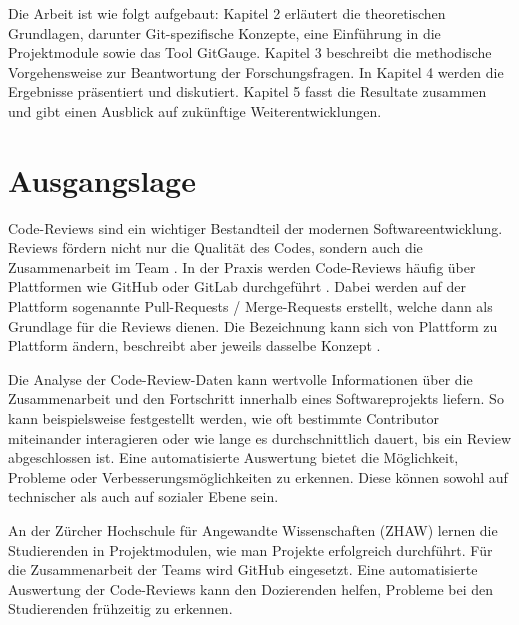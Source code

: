 Die Arbeit ist wie folgt aufgebaut: Kapitel 2 erläutert die theoretischen Grundlagen, darunter Git-spezifische Konzepte, eine Einführung in die Projektmodule sowie das Tool GitGauge. Kapitel 3 beschreibt die methodische Vorgehensweise zur Beantwortung der Forschungsfragen. In Kapitel 4 werden die Ergebnisse präsentiert und diskutiert. Kapitel 5 fasst die Resultate zusammen und gibt einen Ausblick auf zukünftige Weiterentwicklungen.



\label{Chapter1} %


\section{Ausgangslage}
\label{sec:Ausgangslage} 
Code-Reviews sind ein wichtiger Bestandteil der modernen Softwareentwicklung. Reviews fördern nicht nur die Qualität des Codes, sondern auch die Zusammenarbeit im Team \parencite{dos_santos_investigating_2018}. In der Praxis werden Code-Reviews häufig über Plattformen wie GitHub oder GitLab durchgeführt \parencite{noauthor_team_nodate}. Dabei werden auf der Plattform sogenannte Pull-Requests / Merge-Requests erstellt, welche dann als Grundlage für die Reviews dienen. Die Bezeichnung kann sich von Plattform zu Plattform ändern, beschreibt aber jeweils dasselbe Konzept \parencite{kansab_analyzing_2025}.


Die Analyse der Code-Review-Daten kann wertvolle Informationen über die Zusammenarbeit und den Fortschritt innerhalb eines Softwareprojekts liefern. So kann beispielsweise festgestellt werden, wie oft bestimmte Contributor miteinander interagieren oder wie lange es durchschnittlich dauert, bis ein Review abgeschlossen ist. Eine automatisierte Auswertung bietet die Möglichkeit, Probleme oder Verbesserungsmöglichkeiten zu erkennen. Diese können sowohl auf technischer als auch auf sozialer Ebene sein. 

An der Zürcher Hochschule für Angewandte Wissenschaften (ZHAW) lernen die Studierenden in Projektmodulen, wie man Projekte erfolgreich durchführt. Für die Zusammenarbeit der Teams wird GitHub eingesetzt. Eine automatisierte Auswertung der Code-Reviews kann den Dozierenden helfen, Probleme bei den Studierenden frühzeitig zu erkennen.

